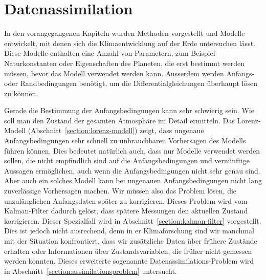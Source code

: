 %
%
%
\chapter{Datenassimilation\label{chapter:assimilation}}
In den vorangegangenen Kapiteln wurden Methoden vorgestellt
und Modelle entwickelt, mit denen sich die Klimaentwicklung auf der
Erde untersuchen lässt.
Diese Modelle enthalten eine Anzahl von Parametern, zum Beispiel
Naturkonstanten oder Eigenschaften des Planeten, die erst bestimmt
werden müssen, bevor das Modell verwendet werden kann.
Ausserdem werden Anfangs- oder Randbedingungen benötigt, um die
Differentialgleichungen überhaupt lösen zu können.

Gerade die Bestimmung der Anfangsbedingungen kann sehr schwierig sein.
Wie soll man den Zustand der gesamten Atmosphäre im Detail ermitteln.
Das Lorenz-Modell (Abschnitt~\ref{section:lorenz-modell}) zeigt, dass
ungenaue Anfangsbedingungen sehr schnell zu unbrauchbaren Vorhersagen
des Modells führen können.
Dies bedeutet natürlich auch, dass nur Modelle verwendet werden sollen,
die nicht empfindlich sind auf die Anfangsbedingungen und vernünftige
Aussagen ermöglichen, auch wenn die Anfangsbedingungen nicht sehr genau 
sind.
Aber auch ein solches Modell kann bei ungenauen Anfangsbedingungen 
nicht lang zuverlässige Vorhersagen machen.
Wir müssen also das Problem lösen, die unzulänglichen Anfangsdaten 
später zu korrigieren.
Dieses Problem wird vom Kalman-Filter dadurch gelöst, dass spätere
Messungen den aktuellen Zustand korrigieren.
Dieser Spezialfall wird in Abschnitt~\ref{section:kalman-filter}
vorgestellt.
Dies ist jedoch nicht ausrechend, denn in er Klimaforschung sind wir
manchmal mit der Situation konfrontiert, dass wir zusätzliche
Daten über frühere Zustände erhalten oder Informationen über Zustandsvariablen,
die früher nicht gemessen werden konnten.
Dieses erweiterte sogenannte Datenassimilations-Problem wird in
Abschnitt~\ref{section:assimilationsproblem} untersucht.







